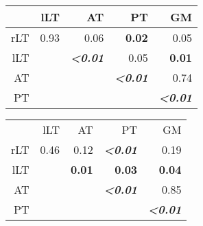 \begin{table}[p]
\begin{tableframe}
{\begin{minipage}{\linewidth}
\begin{tabular}{rrrrr}
				\toprule
		              & lLT   & AT    & PT    & GM \\
		        \midrule
		        rLT   & 0.93  & 0.06  & \textbf{0.02}  & 0.05 \\
		        lLT   &       & \textbf{\emph{<0.01}}  & 0.05  & \textbf{0.01} \\
		        AT    &       &       & \textbf{\emph{<0.01}}  & 0.74 \\
		        PT    &       &       &       & \textbf{\emph{<0.01}} \\
		        \bottomrule
		        \end{tabular}%
                \hspace{0.5cm}
		        \begin{tabular}{rrrrr}
		        \addlinespace
				\multicolumn{5}{c}{\textbf{FWHM$_{z}$}}\\
				\toprule
		              & lLT   & AT    & PT    & GM \\
		        \midrule
		        rLT   & 0.46  & 0.12  & \textbf{\emph{<0.01}}  & 0.19 \\
		        lLT   &       & \textbf{0.01}  & \textbf{0.03}  & \textbf{0.04} \\
		        AT    &       &       & \textbf{\emph{<0.01}}  & 0.85 \\
		        PT    &       &       &       & \textbf{\emph{<0.01}} \\
		        \bottomrule
		        \end{tabular}%
	 \end{minipage}%
	 \label{tab:chap5exp2_qsi single ttest}%
  }
\end{tableframe}
\end{table}
